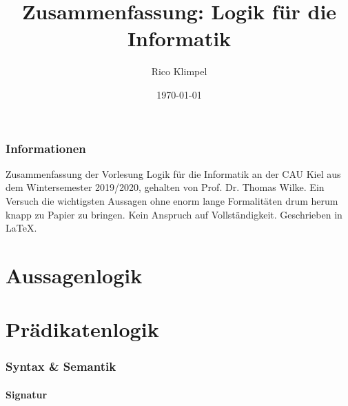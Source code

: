 \documentclass[twocolumn]{article}
\title{Zusammenfassung: Logik für die Informatik }
\author{Rico Klimpel}
\date{\today}
\begin{document}
    \maketitle   
    \tableofcontents

    \setcounter{page}{1}

    \section*{Informationen}
    Zusammenfassung der Vorlesung Logik für die Informatik an der CAU Kiel aus dem Wintersemester 2019/2020, gehalten von Prof. Dr. Thomas Wilke. Ein Versuch die wichtigsten Aussagen ohne enorm lange Formalitäten drum herum knapp zu Papier zu bringen. Kein Anspruch auf Vollständigkeit. Geschrieben in \LaTeX.

    \clearpage

    \part{Aussagenlogik}
    

    \clearpage
    \part{Prädikatenlogik}

    \section{Syntax \& Semantik}

    \subsection{Signatur}
\end{document}
